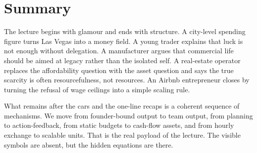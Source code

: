 \section{Summary}

The lecture begins with glamour and ends with structure. A city-level spending figure turns Las Vegas into a money field. A young trader explains that luck is not enough without delegation. A manufacturer argues that commercial life should be aimed at legacy rather than the isolated self. A real-estate operator replaces the affordability question with the asset question and says the true scarcity is often resourcefulness, not resources. An Airbnb entrepreneur closes by turning the refusal of wage ceilings into a simple scaling rule.

What remains after the cars and the one-line recaps is a coherent sequence of mechanisms. We move from founder-bound output to team output, from planning to action-feedback, from static budgets to cash-flow assets, and from hourly exchange to scalable units. That is the real payload of the lecture. The visible symbols are absent, but the hidden equations are there.